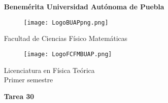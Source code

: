 \documentclass[12pt]{article}
\begin{document}
\begingroup
\begin{titlepage}
	\noindent
	\vspace{1mm}
\end{titlepage}
\endgroup

\pagestyle{empty} 
\setlength{\parindent}{0pt}
\sffamily


\begin{center} 

    \LARGE{\bf{\textsf{Benemérita Universidad Autónoma de Puebla}}} \\[0.5cm]
    
\begin{figure}[htb] \centering

    \texttt{[image: LogoBUAPpng.png]} 

\end{figure}


    \LARGE{Facultad de Ciencias Físico Matemáticas}\\[0.5cm]

\begin{figure}[htb] \centering

    \texttt{[image: LogoFCFMBUAP.png]} 
    
\end{figure} 


    \Large{Licenciatura en Física Teórica}\\[0.5cm]
    \Large{Primer semestre} 

\end{center} \vspace{0.3cm}

\begin{center}

    {\Large{\bfseries{{\textcolor{carrotorange}{Tarea 30}}}}} \\ 
    
\end{center}
\end{document}
